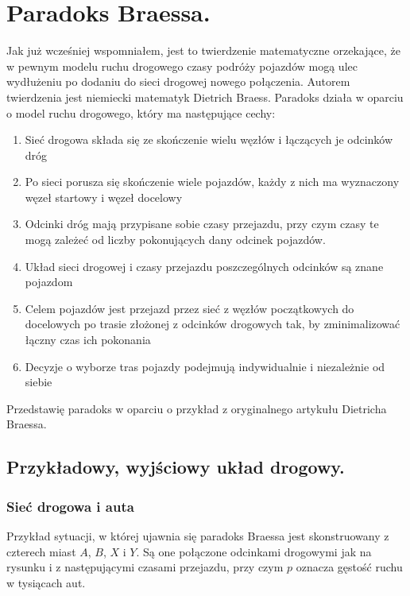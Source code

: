 \documentclass[twoside,12pt]{report}
\begin{document}
\section{Paradoks Braessa.}

Jak już wcześniej wspomniałem, jest to twierdzenie matematyczne orzekające, że w pewnym modelu ruchu drogowego czasy podróży pojazdów mogą ulec wydłużeniu po dodaniu do sieci drogowej nowego połączenia. Autorem twierdzenia jest niemiecki matematyk Dietrich Braess\cite{braess}. Paradoks działa w oparciu o model ruchu drogowego, który ma następujące cechy:

\begin{enumerate}
\item Sieć drogowa składa się ze skończenie wielu węzłów i łączących je odcinków dróg
\item Po sieci porusza się skończenie wiele pojazdów, każdy z nich ma wyznaczony węzeł startowy i węzeł docelowy
\item Odcinki dróg mają przypisane sobie czasy przejazdu, przy czym czasy te mogą zależeć od liczby pokonujących dany odcinek pojazdów.
\item Układ sieci drogowej i czasy przejazdu poszczególnych odcinków są znane pojazdom
\item Celem pojazdów jest przejazd przez sieć z węzłów początkowych do docelowych po trasie złożonej z odcinków drogowych tak, by zminimalizować łączny czas ich pokonania
\item Decyzje o wyborze tras pojazdy podejmują indywidualnie i niezależnie od siebie
\end{enumerate}
Przedstawię paradoks w oparciu o przykład z oryginalnego artykułu Dietricha Braessa\cite{paradox}.

\subsection{Przykładowy, wyjściowy układ drogowy.}
\subsubsection{Sieć drogowa i auta}

Przykład sytuacji, w której ujawnia się paradoks Braessa jest skonstruowany z czterech miast $A$, $B$, $X$ i $Y$. Są one połączone odcinkami drogowymi jak na rysunku i z następującymi czasami przejazdu, przy czym $p$ oznacza gęstość ruchu w tysiącach aut.
\end{document}

